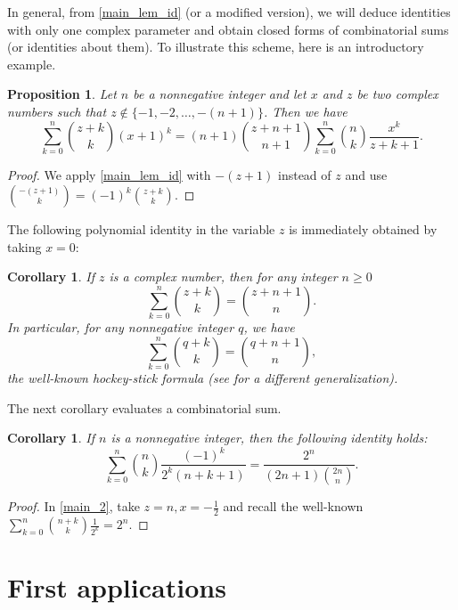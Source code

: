 \documentclass[11pt,reqno]{amsart}
\theoremstyle{plain}
\numberwithin{equation}{section}
\newtheorem{proposition}[thm]{Proposition}
\newtheorem{corollary}[thm]{Corollary}
\begin{document}
In general, from \eqref{main_lem_id} (or a modified version), we will deduce identities with only one complex parameter and obtain closed forms of combinatorial sums (or identities about them). To illustrate this scheme, here is an introductory example.

\begin{proposition}
Let $n$ be a nonnegative integer and let $x$ and $z$ be two complex numbers such that 
$z\notin\{-1,-2,\ldots,-(n+1)\}$. Then we have
\begin{equation}\label{main_2}
\sum_{k=0}^n \binom{z+k}{k} (x+1)^k = (n+1)\binom{z+n+1}{n+1} \sum_{k=0}^n \binom{n}{k} \frac{x^k}{z+k+1}.
\end{equation}
\end{proposition}
\begin{proof}
We apply \eqref{main_lem_id} with $-(z+1)$ instead of $z$ and use $\binom{-(z+1)}{k}=(-1)^k\binom{z+k}{k}$.
\end{proof}

The following polynomial identity in the variable $z$ is immediately obtained by taking $x=0$:

\begin{corollary}\label{main_2_cor_1 }
If $z$ is a complex number, then for any integer $n\ge 0$
\begin{equation}
\sum_{k=0}^n \binom{z+k}{k} = \binom{z+n+1}{n}.
\end{equation}
In particular, for any nonnegative integer $q$, we have
\begin{equation*}
\sum_{k=0}^n \binom{q+k}{k} = \binom{q+n+1}{n},
\end{equation*}
the well-known hockey-stick formula (see \cite{Lynch} for a different generalization).
\end{corollary}

The next corollary evaluates a combinatorial sum.

\begin{corollary} 
If $n$ is a nonnegative integer, then the following identity holds:
\[\sum_{k=0}^n \binom{n}{k} \frac{(-1)^k}{2^k(n+k+1)} = \frac{2^n}{(2n+1)\binom{2n}{n}}.\]
\end{corollary}
\begin{proof}
In \eqref{main_2}, take $z=n,x=-\frac{1}{2}$ and recall the well-known $\sum_{k=0}^n \binom{n+k}{k}\frac{1}{2^k}=2^n$.
\end{proof}

\section{First applications}
\end{document}
